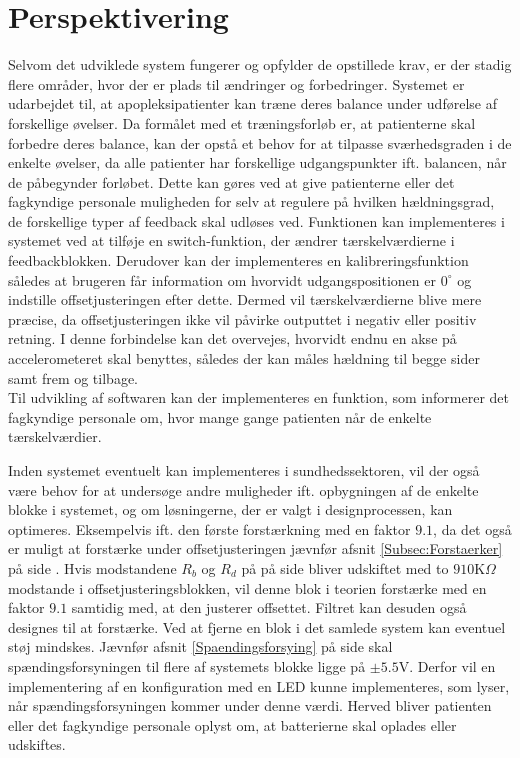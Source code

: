\section{Perspektivering}
Selvom det udviklede system fungerer og opfylder de opstillede krav, er der stadig flere områder, hvor der er plads til ændringer og forbedringer. 
Systemet er udarbejdet til, at apopleksipatienter kan træne deres balance under udførelse af forskellige øvelser. Da formålet med et træningsforløb er, at patienterne skal forbedre deres balance, kan der opstå et behov for at tilpasse sværhedsgraden i de enkelte øvelser, da alle patienter har forskellige udgangspunkter ift. balancen, når de påbegynder forløbet. Dette kan gøres ved at give patienterne eller det fagkyndige personale muligheden for selv at regulere på hvilken hældningsgrad, de forskellige typer af feedback skal udløses ved. Funktionen kan implementeres i systemet ved at tilføje en switch-funktion, der ændrer tærskelværdierne i feedbackblokken. Derudover kan der implementeres en kalibreringsfunktion således at brugeren får information om hvorvidt udgangspositionen er $0^{\circ}$ og indstille offsetjusteringen efter dette. Dermed vil tærskelværdierne blive mere præcise, da offsetjusteringen ikke vil påvirke outputtet i negativ eller positiv retning. %
I denne forbindelse kan det overvejes, hvorvidt endnu en akse på accelerometeret skal benyttes, således der kan måles hældning til begge sider samt frem og tilbage. \\
Til udvikling af softwaren kan der implementeres en funktion, som informerer det fagkyndige personale om, hvor mange gange patienten når de enkelte tærskelværdier.   

Inden systemet eventuelt kan implementeres i sundhedssektoren, vil der også være behov for at undersøge andre muligheder ift. opbygningen af de enkelte blokke i systemet, og om løsningerne, der er valgt i designprocessen, kan optimeres. Eksempelvis ift. den første forstærkning med en faktor $9.1$, da det også er muligt at forstærke under offsetjusteringen jævnfør afsnit \ref{Subsec:Forstaerker} på side \pageref{Subsec:Forstaerker}. Hvis modstandene $R_{b}$ og $R_{d}$ på  på side \pageref{fig:Forstaerker_faktor18} bliver udskiftet med to $910$K$\Omega$ modstande  i offsetjusteringsblokken, vil denne blok i teorien forstærke med en faktor $9.1$ samtidig med, at den justerer offsettet. Filtret kan desuden også designes til at forstærke. Ved at fjerne en blok i det samlede system kan eventuel støj mindskes. Jævnfør afsnit \ref{Spaendingsforsying} på side \pageref{Spaendingsforsying} skal spændingsforsyningen til flere af systemets blokke ligge på $\pm5.5$V. Derfor vil en implementering af en konfiguration med en LED kunne implementeres, som lyser, når spændingsforsyningen kommer under denne værdi. Herved bliver patienten eller det fagkyndige personale oplyst om, at batterierne skal oplades eller udskiftes.


